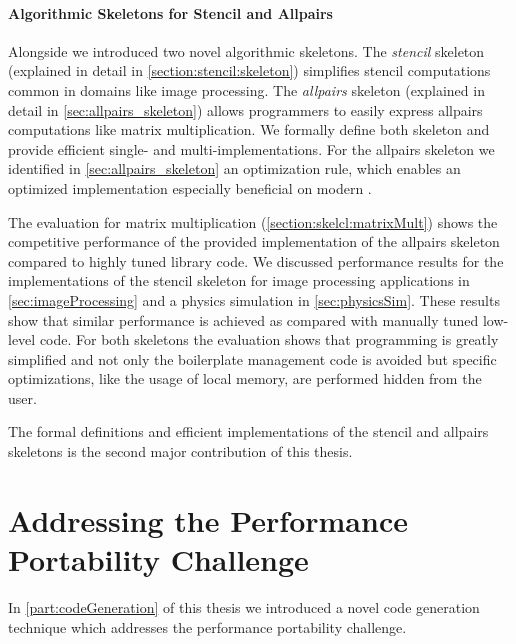 \paragraph{Algorithmic Skeletons for Stencil and Allpairs}
Alongside \SkelCL we introduced two novel algorithmic skeletons.
The \emph{stencil} skeleton (explained in detail in \autoref{section:stencil:skeleton}) simplifies stencil computations common in domains like image processing.
The \emph{allpairs} skeleton (explained in detail in \autoref{sec:allpairs_skeleton}) allows programmers to easily express allpairs computations like matrix multiplication.
We formally define both skeleton and provide efficient single- and multi-\GPU implementations.
For the allpairs skeleton we identified in \autoref{sec:allpairs_skeleton} an optimization rule, which enables an optimized implementation especially beneficial on modern \GPUs.

The evaluation for matrix multiplication (\autoref{section:skelcl:matrixMult}) shows the competitive performance of the provided implementation of the allpairs skeleton compared to highly tuned library code.
We discussed performance results for the implementations of the stencil skeleton for image processing applications in \autoref{sec:imageProcessing} and a physics simulation in \autoref{sec:physicsSim}.
These results show that similar performance is achieved as compared with manually tuned low-level \OpenCL code.
For both skeletons the evaluation shows that programming is greatly simplified and not only the boilerplate management code is avoided but \GPU specific optimizations, like the usage of local memory, are performed hidden from the user.

\bigskip
The formal definitions and efficient \GPU implementations of the stencil and allpairs skeletons is the second major contribution of this thesis.


\section{Addressing the Performance Portability Challenge}
In \autoref{part:codeGeneration} of this thesis we introduced a novel code generation technique which addresses the performance portability challenge.

